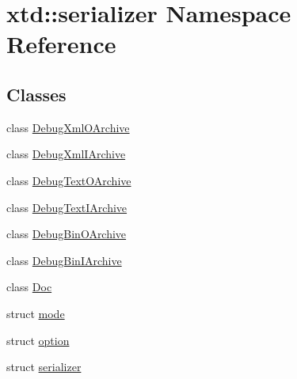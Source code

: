 \hypertarget{namespacextd_1_1serializer}{\section{xtd\-:\-:serializer Namespace Reference}
\label{namespacextd_1_1serializer}
}
\subsection*{Classes}
\begin{DoxyCompactItemize}
\item 
class \hyperlink{classxtd_1_1serializer_1_1DebugXmlOArchive}{Debug\-Xml\-O\-Archive}
\item 
class \hyperlink{classxtd_1_1serializer_1_1DebugXmlIArchive}{Debug\-Xml\-I\-Archive}
\item 
class \hyperlink{classxtd_1_1serializer_1_1DebugTextOArchive}{Debug\-Text\-O\-Archive}
\item 
class \hyperlink{classxtd_1_1serializer_1_1DebugTextIArchive}{Debug\-Text\-I\-Archive}
\item 
class \hyperlink{classxtd_1_1serializer_1_1DebugBinOArchive}{Debug\-Bin\-O\-Archive}
\item 
class \hyperlink{classxtd_1_1serializer_1_1DebugBinIArchive}{Debug\-Bin\-I\-Archive}
\item 
class \hyperlink{classxtd_1_1serializer_1_1Doc}{Doc}
\item 
struct \hyperlink{structxtd_1_1serializer_1_1mode}{mode}
\item 
struct \hyperlink{structxtd_1_1serializer_1_1option}{option}
\item 
struct \hyperlink{structxtd_1_1serializer_1_1serializer}{serializer}
\end{DoxyCompactItemize}
